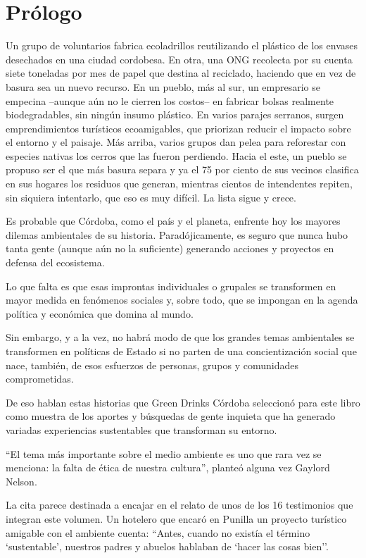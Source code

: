 \protect\hypertarget{_Toc486429354}{}{}

\chapter{Prólogo}\label{pruxf3logo}

Un grupo de voluntarios fabrica ecoladrillos reutilizando el plástico de
los envases desechados en una ciudad cordobesa. En otra, una ONG
recolecta por su cuenta siete toneladas por mes de papel que destina al
reciclado, haciendo que en vez de basura sea un nuevo recurso. En un
pueblo, más al sur, un empresario se empecina --aunque aún no le cierren
los costos-- en fabricar bolsas realmente biodegradables, sin ningún
insumo plástico. En varios parajes serranos, surgen emprendimientos
turísticos ecoamigables, que priorizan reducir el impacto sobre el
entorno y el paisaje. Más arriba, varios grupos dan pelea para
reforestar con especies nativas los cerros que las fueron perdiendo.
Hacia el este, un pueblo se propuso ser el que más basura separa y ya el
75 por ciento de sus vecinos clasifica en sus hogares los residuos que
generan, mientras cientos de intendentes repiten, sin siquiera
intentarlo, que eso es muy difícil. La lista sigue y crece.

Es probable que Córdoba, como el país y el planeta, enfrente hoy los
mayores dilemas ambientales de su historia. Paradójicamente, es seguro
que nunca hubo tanta gente (aunque aún no la suficiente) generando
acciones y proyectos en defensa del ecosistema.

Lo que falta es que esas improntas individuales o grupales se
transformen en mayor medida en fenómenos sociales y, sobre todo, que se
impongan en la agenda política y económica que domina al mundo.

Sin embargo, y a la vez, no habrá modo de que los grandes temas
ambientales se transformen en políticas de Estado si no parten de una
concientización social que nace, también, de esos esfuerzos de personas,
grupos y comunidades comprometidas.

De eso hablan estas historias que Green Drinks Córdoba seleccionó para
este libro como muestra de los aportes y búsquedas de gente inquieta que
ha generado variadas experiencias sustentables que transforman su
entorno.

``El tema más importante sobre el medio ambiente es uno que rara vez se
menciona: la falta de ética de nuestra cultura'', planteó alguna vez
Gaylord Nelson.

La cita parece destinada a encajar en el relato de unos de los 16
testimonios que integran este volumen. Un hotelero que encaró en Punilla
un proyecto turístico amigable con el ambiente cuenta: ``Antes, cuando
no existía el término `sustentable', nuestros padres y abuelos hablaban
de `hacer las cosas bien''.

